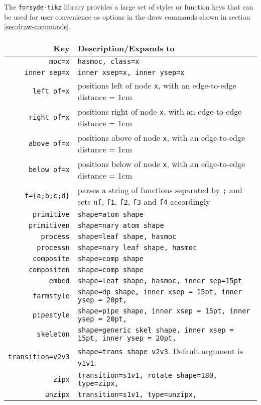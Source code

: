 \documentclass[10pt]{article}
\newcommand\bookmark[1]{\marginpar{\ttfamily #1}}
\begin{document}
\bookmark{node helper keys}
The \texttt{forsyde-tikz} library provides a large set of styles or function keys that can be used for user convenience as options in the draw commands shown in section \ref{sec:draw-commands}. 

\begin{longtable} { r|p{11cm} }
  \toprule
  \textbf{Key}  & \textbf{Description/Expands to}  \\
  \midrule
  \texttt{moc=x} & \texttt{hasmoc, class=x} \\
  \texttt{inner sep=x} & \texttt{inner xsep=x, inner ysep=x} \\
  \texttt{left of=x} & positions left of node \texttt{x}, with an edge-to-edge distance = 1cm \\
  \texttt{right of=x} & positions right of node \texttt{x}, with an edge-to-edge distance = 1cm \\
  \texttt{above of=x} & positions above of node \texttt{x}, with an edge-to-edge distance = 1cm \\
  \texttt{below of=x} & positions below of node \texttt{x}, with an edge-to-edge distance = 1cm \\
  \texttt{f=\{a;b;c;d\}} & parses a string of functions separated by \texttt{;} and sets \texttt{nf}, \texttt{f1}, \texttt{f2}, \texttt{f3} and \texttt{f4} accordingly \\
  \texttt{primitive} & \texttt{shape=atom shape} \\
  \texttt{primitiven} & \texttt{shape=nary atom shape} \\
  \texttt{process} & \texttt{shape=leaf shape, hasmoc} \\
  \texttt{processn} & \texttt{shape=nary leaf shape, hasmoc} \\
  \texttt{composite} & \texttt{shape=comp shape} \\
  \texttt{compositen} & \texttt{shape=comp shape} \\
  \texttt{embed} & \texttt{shape=leaf shape, hasmoc, inner sep=15pt} \\
  \texttt{farmstyle} & \texttt{shape=dp shape, inner xsep = 15pt, inner ysep = 20pt,} \\
  \texttt{pipestyle} & \texttt{shape=pipe shape, inner xsep = 15pt, inner ysep = 20pt,} \\
  \texttt{skeleton} & \texttt{shape=generic skel shape, inner xsep = 15pt, inner ysep = 20pt,} \\
  \texttt{transition=v2v3} & \texttt{shape=trans shape v2v3}. Default argument is \texttt{v1v1}. \\
  \texttt{zipx} & \texttt{transition={s1v1}, rotate shape=180, type=zipx,} \\
  \texttt{unzipx} & \texttt{transition={s1v1}, type=unzipx,} \\
  \bottomrule
\end{longtable}
\end{document}
